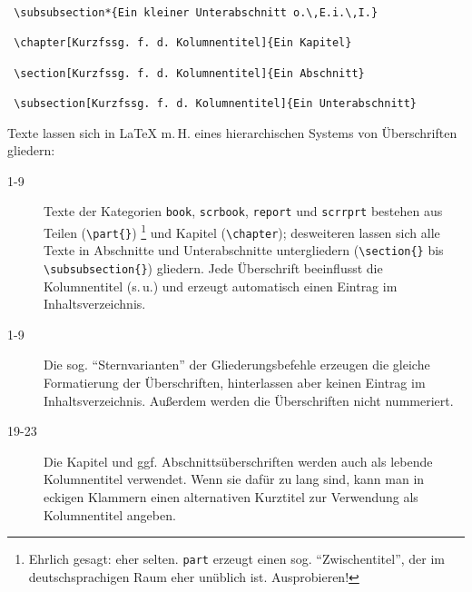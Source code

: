 \begin{lstlisting}
 \subsubsection*{Ein kleiner Unterabschnitt o.\,E.i.\,I.}
 
 \chapter[Kurzfssg. f. d. Kolumnentitel]{Ein Kapitel}
 
 \section[Kurzfssg. f. d. Kolumnentitel]{Ein Abschnitt}
 
 \subsection[Kurzfssg. f. d. Kolumnentitel]{Ein Unterabschnitt}
\end{lstlisting}

Texte lassen sich in \LaTeX{} m.\,H. eines hierarchischen Systems von Überschriften gliedern:

\begin{description}
 \item[1-9] Texte der Kategorien 
    \lstinline/book/, 
    \lstinline/scrbook/, 
    \lstinline/report/ und 
    \lstinline/scrrprt/ 
 bestehen aus Teilen (\lstinline/\part{}/)
 \footnote{Ehrlich gesagt: eher selten. 
 \lstinline/part/ 
 erzeugt einen sog. \enquote{Zwischentitel},
 der im deutschsprachigen Raum eher unüblich ist. Ausprobieren! }
 und Kapitel (\lstinline/\chapter/);
 desweiteren lassen sich alle Texte in Abschnitte und Unterabschnitte untergliedern 
 (\lstinline/\section{}/ bis \lstinline/\subsubsection{}/) 
 gliedern.
 Jede Überschrift beeinflusst die Kolumnentitel (s.\,u.) und erzeugt automatisch einen Eintrag
 im Inhaltsverzeichnis.
 \item[1-9] Die sog. \enquote{Sternvarianten} der Gliederungsbefehle erzeugen die gleiche
 Formatierung der Überschriften, hinterlassen aber keinen Eintrag im Inhaltsverzeichnis.
 Außerdem werden die Überschriften nicht nummeriert.
 \item[19-23] Die Kapitel und ggf. Abschnittsüberschriften werden auch als lebende Kolumnentitel
 verwendet. Wenn sie dafür zu lang sind, kann man in eckigen Klammern einen alternativen
 Kurztitel zur Verwendung als Kolumnentitel angeben. 
\end{description}



